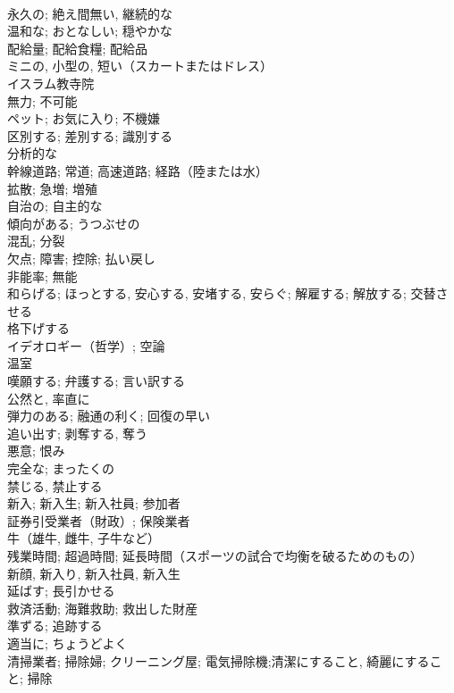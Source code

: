 \documentclass[8pt]{extreport}
\begin{document}
\begin{CJK}{UTF8}{min}
\\	永久の; 絶え間無い, 継続的な	
\\	温和な; おとなしい; 穏やかな	
\\	配給量; 配給食糧; 配給品	
\\	ミニの, 小型の, 短い（スカートまたはドレス）	
\\	イスラム教寺院	
\\	無力; 不可能	
\\	ペット; お気に入り; 不機嫌	
\\	区別する; 差別する; 識別する	
\\	分析的な	
\\	幹線道路; 常道; 高速道路; 経路（陸または水）	
\\	拡散; 急増; 増殖	
\\	自治の; 自主的な	
\\	傾向がある; うつぶせの	
\\	混乱; 分裂	
\\	欠点; 障害; 控除; 払い戻し	
\\	非能率; 無能	
\\	和らげる; ほっとする, 安心する, 安堵する, 安らぐ; 解雇する; 解放する; 交替させる	
\\	格下げする	
\\	イデオロギー（哲学）; 空論	
\\	温室	
\\	嘆願する; 弁護する; 言い訳する	
\\	公然と, 率直に	
\\	弾力のある; 融通の利く; 回復の早い	
\\	追い出す; 剥奪する, 奪う	
\\	悪意; 恨み	
\\	完全な; まったくの	
\\	禁じる, 禁止する	
\\	新入; 新入生; 新入社員; 参加者	
\\	証券引受業者（財政）; 保険業者	
\\	牛（雄牛, 雌牛, 子牛など）	
\\	残業時間; 超過時間; 延長時間（スポーツの試合で均衡を破るためのもの）	
\\	新顔, 新入り, 新入社員, 新入生	
\\	延ばす; 長引かせる	
\\	救済活動; 海難救助; 救出した財産	
\\	準ずる; 追跡する	
\\	適当に; ちょうどよく	
\\	清掃業者; 掃除婦; クリーニング屋; 電気掃除機;清潔にすること, 綺麗にすること; 掃除	

\end{CJK}
\end{document}
